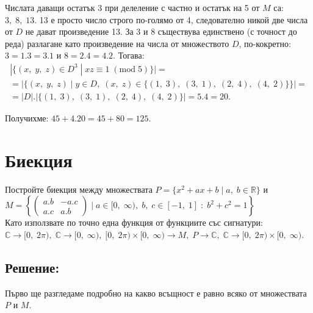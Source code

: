 \documentclass[a4paper, 12pt, oneside]{article}
\newcommand{\R}{\mathbb{R}}
\newcommand{\Complex}{\mathbb{C}}
\begin{document}
Числата даващи остатък 3 при делеление с частно и остатък на 5 от $M$ са: $3, \; 8, \; 13$.
13 е просто число строго по-голямо от 4, следователно никой две числа от $D$ не дават произведение 13.
За 3 и 8 съществува единствено (с точност до реда) разлагане като произведение на числа от множеството $D$,
по-кокретно: $3 = 1.3 = 3.1$ и $8 = 2.4 = 4.2$. Тогава:
\begin{align*}
    |\{(x, \; y, \; z) \in D^3 \; | \; xz \equiv 1 \; (\mathrm{mod} \; 5)\}| = \\
    = |\{(x, \; y, \; z) \; | \; y \in D, \; (x, \; z) \in \{(1, \; 3), \; (3, \; 1), \; (2, \; 4), \; (4, \; 2)\}\}| = \\
    = |D|.|\{(1, \; 3), \; (3, \; 1), \; (2, \; 4), \; (4, \; 2)\}| = 5.4 = 20.
\end{align*}

Получихме: $45 + 4.20 = 45 + 80 = 125$.

\section*{Биекция}
Постройте биекция между множествата $P = \{x^2 + ax + b \; | \; a, \; b \in \R\}$ и \\

$M = \left\{\begin{pmatrix}
    a.b & -a.c \\
    a.c & a.b
\end{pmatrix} \; \Big | \; a \in [0, \; \infty), \; b, \; c \in [-1, \; 1] \; : \; b^2 + c^2 = 1     
\right\}$ \\

Като използвате по точно една функция от функциите със сигнатури: \\
$\Complex \to [0, \; 2\pi), \; \Complex \to [0, \; \infty), \; [0, \; 2\pi) \times [0, \; \infty) \to M, \; P \to \Complex, \; \Complex \to [0, \; 2\pi) \times [0, \; \infty)$.

\subsection*{Решение:}
Първо ще разгледаме подробно на какво всъщност е равно всяко от множествата $P$ и $M$. \\
\end{document}

